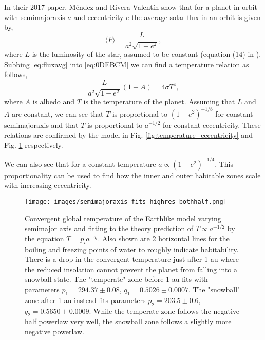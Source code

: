 \documentclass[12pt, onecolumn]{revtex4-2}    %
\begin{document}
In their 2017 paper, Méndez and Rivera-Valentín show that for a planet in orbit with semimajoraxis $a$ and eccentricity $e$ the average solar flux in an orbit is given by,
\begin{equation} \label{eq:fluxavg}
    \langle F\rangle = \frac{L}{a^2 \sqrt{1-e^2}},
\end{equation}
where $L$ is the luminosity of the star, assumed to be constant (equation (14) in \cite{Mendez2017}).
Subbing \eqref{eq:fluxavg} into \eqref{eq:0DEBCM} we can find a temperature relation as follows,
\begin{equation}
    \frac{L}{a^2 \sqrt{1-e^2}} (1-A) = 4 \sigma T^4,
    \label{eq:Temp_eccent}
\end{equation}
where $A$ is albedo and $T$ is the temperature of the planet.
Assuming that $L$ and $A$ are constant, we can see that $T$ is proportional to $(1-e^2)^{-1/8}$ for constant semimajoraxis and that $T$ is proportional to $a^{-1/2}$ for constant eccentricity.
These relations are confirmed by the model in Fig. \ref{fig:temperature_eccentricity} and Fig. \ref{fig:temperature_semimajoraxis} respectively.

We can also see that for a constant temperature $a \propto (1-e^2)^{-1/4}$.
This proportionality can be used to find how the inner and outer habitable zones scale with increasing eccentricity.

\begin{figure}
    \texttt{[image: images/semimajoraxis\_fits\_highres\_bothhalf.png]}
    \caption{Convergent global temperature of the Earthlike model varying semimajor axis and fitting to the theory prediction of $T \propto a^{-1/2}$ by the equation $T = p_i a^{-q_i}$.
        Also shown are 2 horizontal lines for the boiling and freezing points of water to roughly indicate habitability.
        There is a drop in the convergent temperature just after 1 au where the reduced insolation cannot prevent the planet from falling into a snowball state.
        The "temperate" zone before 1 au fits with parameters $p_1 = 294.37 \pm 0.08$, $q_1 = 0.5026 \pm 0.0007$.
        The "snowball" zone after 1 au instead fits parameters $p_2 = 203.5 \pm 0.6$, $q_2 = 0.5650 \pm 0.0009$.
        While the temperate zone follows the negative-half powerlaw very well, the snowball zone follows a slightly more negative powerlaw.}
    \label{fig:temperature_semimajoraxis}
\end{figure}
\end{document}
